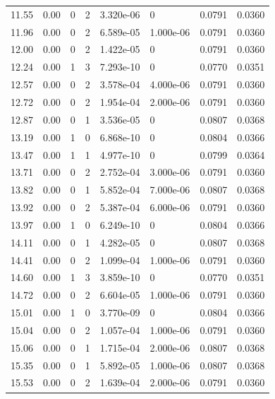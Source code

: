 \documentclass[preview]{standalone}
\begin{document}
{{{\begin{tabular}{L{1.2cm}C{1.2cm} C{0.3cm}C{0.5cm} C{1.4cm}C{1.4cm} C{1.4cm}C{1.4cm}}
  11.55  &  0.00  & 0     &  2 &  3.320e-06  & 0  & 0.0791 &  0.0360   \\ 
  11.96  &  0.00  & 0     &  2 &  6.589e-05  & 1.000e-06  & 0.0791 &  0.0360   \\ 
  12.00  &  0.00  & 0     &  2 &  1.422e-05  & 0  & 0.0791 &  0.0360   \\ 
  12.24  &  0.00  & 1     &  3 &  7.293e-10  & 0  & 0.0770 &  0.0351   \\ 
  12.57  &  0.00  & 0     &  2 &  3.578e-04  & 4.000e-06  & 0.0791 &  0.0360   \\ 
  12.72  &  0.00  & 0     &  2 &  1.954e-04  & 2.000e-06  & 0.0791 &  0.0360   \\ 
  12.87  &  0.00  & 0     &  1 &  3.536e-05  & 0  & 0.0807 &  0.0368   \\ 
  13.19  &  0.00  & 1     &  0 &  6.868e-10  & 0  & 0.0804 &  0.0366   \\ 
  13.47  &  0.00  & 1     &  1 &  4.977e-10  & 0  & 0.0799 &  0.0364   \\ 
  13.71  &  0.00  & 0     &  2 &  2.752e-04  & 3.000e-06  & 0.0791 &  0.0360   \\ 
  13.82  &  0.00  & 0     &  1 &  5.852e-04  & 7.000e-06  & 0.0807 &  0.0368   \\ 
  13.92  &  0.00  & 0     &  2 &  5.387e-04  & 6.000e-06  & 0.0791 &  0.0360   \\ 
  13.97  &  0.00  & 1     &  0 &  6.249e-10  & 0  & 0.0804 &  0.0366   \\ 
  14.11  &  0.00  & 0     &  1 &  4.282e-05  & 0  & 0.0807 &  0.0368   \\ 
  14.41  &  0.00  & 0     &  2 &  1.099e-04  & 1.000e-06  & 0.0791 &  0.0360   \\ 
  14.60  &  0.00  & 1     &  3 &  3.859e-10  & 0  & 0.0770 &  0.0351   \\ 
  14.72  &  0.00  & 0     &  2 &  6.604e-05  & 1.000e-06  & 0.0791 &  0.0360   \\ 
  15.01  &  0.00  & 1     &  0 &  3.770e-09  & 0  & 0.0804 &  0.0366   \\ 
  15.04  &  0.00  & 0     &  2 &  1.057e-04  & 1.000e-06  & 0.0791 &  0.0360   \\ 
  15.06  &  0.00  & 0     &  1 &  1.715e-04  & 2.000e-06  & 0.0807 &  0.0368   \\ 
  15.35  &  0.00  & 0     &  1 &  5.892e-05  & 1.000e-06  & 0.0807 &  0.0368   \\ 
  15.53  &  0.00  & 0     &  2 &  1.639e-04  & 2.000e-06  & 0.0791 &  0.0360   \\ 

\end{tabular}}}}
\end{document}
